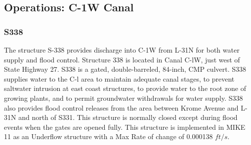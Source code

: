 %
%
%



\clearpage
\subsection{Operations: C-1W Canal}

\subsubsection{S338}
The structure S-338 provides discharge into C-1W from L-31N for both water supply and flood control.
Structure 338 is located in Canal C-lW, just west of State Highway 27. S338 is a gated, double-barreled, 84-inch, CMP culvert. S338 supplies water to the C-l area to maintain adequate canal stages, to prevent saltwater intrusion at east coast structures, to provide water to the root zone of growing plants, and to permit groundwater withdrawals for water supply. S338 also provides flood control releases from the area between Krome Avenue and L-31N and north of S331. This structure is normally closed except during flood events when the gates are opened fully. This structure is implemented in MIKE 11 as an Underflow structure with a Max Rate of change of 0.000138 $ft/s$.



